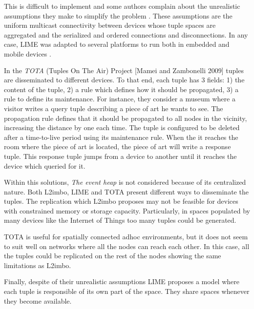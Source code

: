 This is difficult to implement and some authors complain about the unrealistic assumptions they make to simplify the problem \cite{coulouris_distributed_2012}. %
These assumptions are the uniform multicast connectivity between devices whose tuple spaces are aggregated and the serialized and ordered connections and disconnections.
In any case, LIME was adapted to several platforms to run both in embedded and mobile devices \cite{murphy_transiently_2006}.


In the \emph{TOTA} (Tuples On The Air) Project [Mamei and Zambonelli 2009] tuples are disseminated to different devices. %
To that end, each tuple has 3 fields:
1) the content of the tuple,
2) a rule which defines how it should be propagated,
3) a rule to define its maintenance.
For instance, they consider a museum where a visitor writes a query tuple describing a piece of art he wants to see.
The propagation rule defines that it should be propagated to all nodes in the vicinity, increasing the distance by one each time.
The tuple is configured to be deleted after a time-to-live period using its maintenance rule.
When the it reaches the room where the piece of art is located, the piece of art will write a response tuple.
This response tuple jumps from a device to another until it reaches the device which queried for it.


\bigskip


Within this solutions, \emph{The event heap} is not considered because of its centralized nature.
Both L2imbo, LIME and TOTA present different ways to disseminate the tuples.
The replication which L2imbo proposes may not be feasible for devices with constrained memory or storage capacity.
Particularly, in spaces populated by many devices like the Internet of Things too many tuples could be generated.

TOTA is useful for spatially connected adhoc environments, but it does not seem to suit well on networks where all the nodes can reach each other.
In this case, all the tuples could be replicated on the rest of the nodes showing the same limitations as L2imbo.%

Finally, despite of their unrealistic assumptions LIME proposes a model where each tuple is responsible of its own part of the space.
They share spaces whenever they become available.


